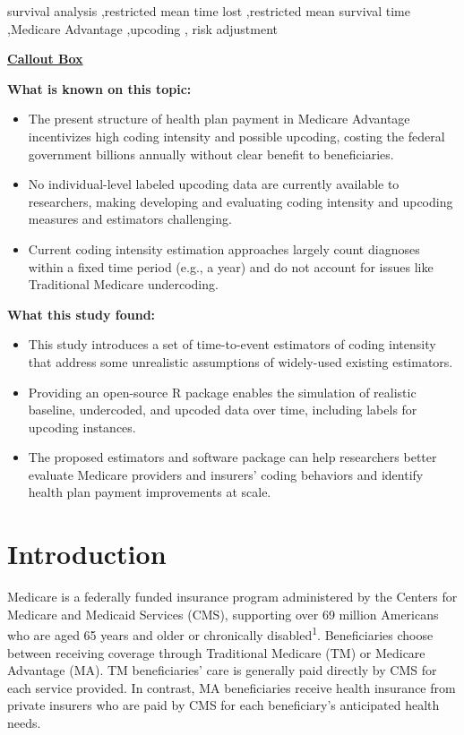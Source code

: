 \documentclass[
  12pt,
  number]{elsarticle}
\begin{document}
\begin{frontmatter}
\begin{keyword}
    survival analysis \sep restricted mean time lost \sep restricted
mean survival time \sep Medicare Advantage \sep upcoding \sep 
    risk adjustment
\end{keyword}
\end{frontmatter}
    

\newpage{}

\ul{\textbf{Callout Box}}

\textbf{What is known on this topic:}

\begin{itemize}
\item
  The present structure of health plan payment in Medicare Advantage
  incentivizes high coding intensity and possible upcoding, costing the
  federal government billions annually without clear benefit to
  beneficiaries.
\item
  No individual-level labeled upcoding data are currently available to
  researchers, making developing and evaluating coding intensity and
  upcoding measures and estimators challenging.
\item
  Current coding intensity estimation approaches largely count diagnoses
  within a fixed time period (e.g., a year) and do not account for
  issues like Traditional Medicare undercoding.
\end{itemize}

\textbf{What this study found:}

\begin{itemize}
\item
  This study introduces a set of time-to-event estimators of coding
  intensity that address some unrealistic assumptions of widely-used
  existing estimators.
\item
  Providing an open-source R package enables the simulation of realistic
  baseline, undercoded, and upcoded data over time, including labels for
  upcoding instances.
\item
  The proposed estimators and software package can help researchers
  better evaluate Medicare providers and insurers' coding behaviors and
  identify health plan payment improvements at scale.
\end{itemize}

\section{Introduction}\label{introduction}

Medicare is a federally funded insurance program administered by the
Centers for Medicare and Medicaid Services (CMS), supporting over 69
million Americans who are aged 65 years and older or chronically
disabled\textsuperscript{1}. Beneficiaries choose between receiving
coverage through Traditional Medicare (TM) or Medicare Advantage (MA).
TM beneficiaries' care is generally paid directly by CMS for each
service provided. In contrast, MA beneficiaries receive health insurance
from private insurers who are paid by CMS for each beneficiary's
anticipated health needs.
\end{document}
